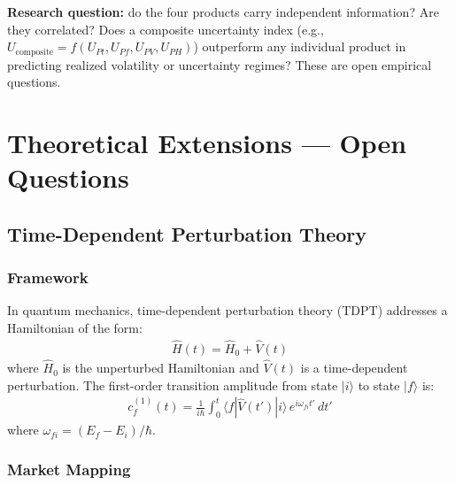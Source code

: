 \documentclass[11pt]{article}
\begin{document}
\textbf{Research question:} do the four products carry independent information? Are they correlated? Does a composite uncertainty index (e.g., $U_{\mathrm{composite}} = f(U_{Pt}, U_{Pf}, U_{PV}, U_{PH})$) outperform any individual product in predicting realized volatility or uncertainty regimes? These are open empirical questions.

\section{Theoretical Extensions --- Open Questions}

\subsection{Time-Dependent Perturbation Theory}

\subsubsection{Framework}

In quantum mechanics, time-dependent perturbation theory (TDPT) addresses a Hamiltonian of the form:
\begin{align}
    \hat{H}(t) = \hat{H}_0 + \hat{V}(t)
\end{align}
where $\hat{H}_0$ is the unperturbed Hamiltonian and $\hat{V}(t)$ is a time-dependent perturbation. The first-order transition amplitude from state $|i\rangle$ to state $|f\rangle$ is:
\begin{align}
    c_f^{(1)}(t) = \frac{1}{i\hbar} \int_0^t \langle f | \hat{V}(t') | i \rangle\, e^{i\omega_{fi} t'}\, dt'
\end{align}
where $\omega_{fi} = (E_f - E_i)/\hbar$.

\subsubsection{Market Mapping}
\end{document}
